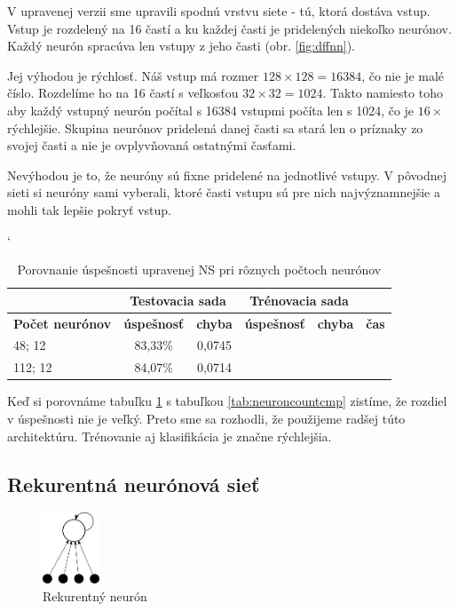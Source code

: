 V upravenej verzii sme upravili spodnú vrstvu siete - tú, ktorá dostáva vstup. Vstup je rozdelený na 16 častí a ku každej časti je pridelených niekoľko neurónov. Každý neurón spracúva len vstupy z jeho časti (obr. \ref{fig:dffnn}). 

Jej výhodou je rýchlosť. Náš vstup má rozmer $128\times 128 = 16384$, čo nie je malé číslo. Rozdelíme ho na 16 častí s veľkosťou $32\times 32 = 1024$. Takto namiesto toho aby každý vstupný neurón počítal s 16384 vstupmi počíta len s 1024, čo je $16\times$ rýchlejšie. Skupina neurónov pridelená danej časti sa stará len o príznaky zo svojej časti a nie je ovplyvňovaná ostatnými časťami. 

Nevýhodou je to, že neuróny sú fixne pridelené na jednotlivé vstupy. V pôvodnej sieti si neuróny sami vyberali, ktoré časti vstupu sú pre nich najvýznamnejšie a mohli tak lepšie pokryť vstup.

\begin{table}[h]
\catcode` %
\centering
\begin{tabular}{|l|c|c|c|c|c|}
\cline{2-5}
\multicolumn{1}{l}{} & \multicolumn{2}{|c|}{\textbf{Testovacia sada}} & \multicolumn{2}{c|}{\textbf{Trénovacia sada}} & \multicolumn{1}{l}{}\\ 
\hline
\textbf{Počet neurónov} & \textbf{úspešnosť} & \textbf{chyba} & \textbf{úspešnosť} & \textbf{chyba} & \textbf{čas} \\ \hline
48; 12 & 83,33\% & 0,0745 & & &\\ \hline
112; 12 & 84,07\% & 0,0714 & & &\\
\hline
\end{tabular}
\caption{Porovnanie úspešnosti upravenej NS pri rôznych počtoch neurónov}
\label{tab:neuroncountcmp2}
\end{table}

Keď si porovnáme tabuľku \ref{tab:neuroncountcmp2} s tabuľkou \ref{tab:neuroncountcmp} zistíme, že rozdiel v úspešnosti nie je veľký. Preto sme sa rozhodli, že použijeme radšej túto architektúru. Trénovanie aj klasifikácia je značne rýchlejšia.

\subsection{Rekurentná neurónová sieť}

\begin{figure}[h]
  \begin{center}
    \includegraphics[width=0.15\textwidth]{images/recneuron}
  \end{center}
  \caption{Rekurentný neurón}
  \label{fig:recurentneuron}
\end{figure}

